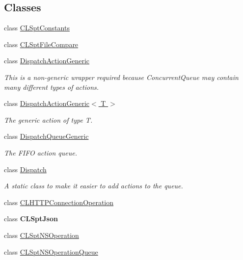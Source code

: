 \subsection*{Classes}
\begin{DoxyCompactItemize}
\item 
class \hyperlink{class_cloud_api_public_1_1_support_1_1_c_l_spt_constants}{C\-L\-Spt\-Constants}
\item 
class \hyperlink{class_cloud_api_public_1_1_support_1_1_c_l_spt_file_compare}{C\-L\-Spt\-File\-Compare}
\item 
class \hyperlink{class_cloud_api_public_1_1_support_1_1_dispatch_action_generic}{Dispatch\-Action\-Generic}
\begin{DoxyCompactList}\small\item\em This is a non-\/generic wrapper required because Concurrent\-Queue may contain many different types of actions. \end{DoxyCompactList}\item 
class \hyperlink{class_cloud_api_public_1_1_support_1_1_dispatch_action_generic_3_01_t_01_4}{Dispatch\-Action\-Generic$<$ T $>$}
\begin{DoxyCompactList}\small\item\em The generic action of type T. \end{DoxyCompactList}\item 
class \hyperlink{class_cloud_api_public_1_1_support_1_1_dispatch_queue_generic}{Dispatch\-Queue\-Generic}
\begin{DoxyCompactList}\small\item\em The F\-I\-F\-O action queue. \end{DoxyCompactList}\item 
class \hyperlink{class_cloud_api_public_1_1_support_1_1_dispatch}{Dispatch}
\begin{DoxyCompactList}\small\item\em A static class to make it easier to add actions to the queue. \end{DoxyCompactList}\item 
class \hyperlink{class_cloud_api_public_1_1_support_1_1_c_l_h_t_t_p_connection_operation}{C\-L\-H\-T\-T\-P\-Connection\-Operation}
\item 
class {\bfseries C\-L\-Spt\-Json}
\item 
class \hyperlink{class_cloud_api_public_1_1_support_1_1_c_l_spt_n_s_operation}{C\-L\-Spt\-N\-S\-Operation}
\item 
class \hyperlink{class_cloud_api_public_1_1_support_1_1_c_l_spt_n_s_operation_queue}{C\-L\-Spt\-N\-S\-Operation\-Queue}

\end{DoxyCompactItemize}
